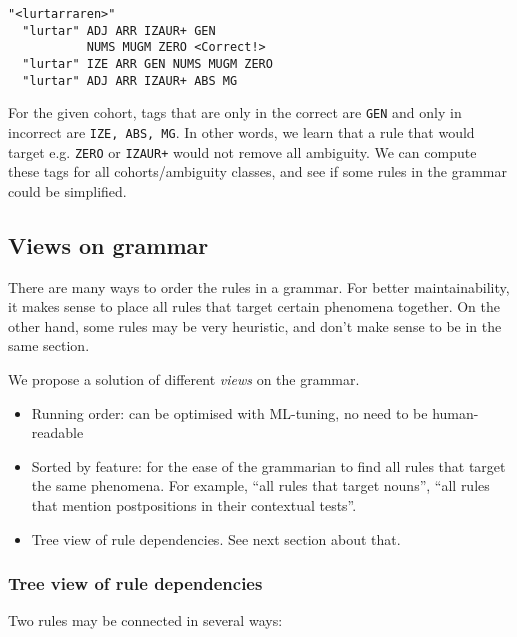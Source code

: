 \documentclass[11pt]{article}
\def\t#1{\texttt{#1}}
\begin{document}
\begin{verbatim}
"<lurtarraren>"
  "lurtar" ADJ ARR IZAUR+ GEN 
           NUMS MUGM ZERO <Correct!>
  "lurtar" IZE ARR GEN NUMS MUGM ZERO 
  "lurtar" ADJ ARR IZAUR+ ABS MG
\end{verbatim}

For the given cohort, tags that are only in the correct are \t{GEN} and only in incorrect are \t{IZE, ABS, MG}.
In other words, we learn that a rule that would target e.g. \t{ZERO} or \t{IZAUR+} would not remove all ambiguity.
We can compute these tags for all cohorts/ambiguity classes, and see if some rules in the grammar could be simplified.


\subsection{Views on grammar}

There are many ways to order the rules in a grammar. For better maintainability, 
it makes sense to place all rules that target certain phenomena together.
On the other hand, some rules may be very heuristic, and don't make sense to be in the same section.

We propose a solution of different \emph{views} on the grammar.
\begin{itemize}
\item Running order: can be optimised with ML-tuning, no need to be human-readable
\item Sorted by feature: for the ease of the grammarian to find all rules that target the same phenomena.
For example, ``all rules that target nouns'', ``all rules that mention postpositions in their contextual tests''.
\item Tree view of rule dependencies. See next section about that.
\end{itemize}



\subsubsection{Tree view of rule dependencies}

Two rules may be connected in several ways:
\end{document}
